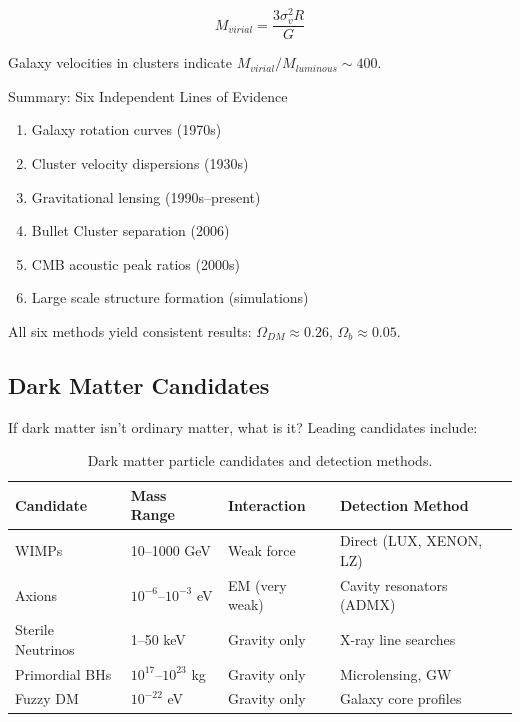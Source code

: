 \documentclass[11pt,a4paper]{article}
\begin{document}
\begin{equationbox}
\begin{equation}
M_{virial} = \frac{3\sigma_v^2 R}{G}
\label{eq:virial}
\end{equation}
\end{equationbox}

Galaxy velocities in clusters indicate $M_{virial}/M_{luminous} \sim 400$.

\begin{conceptbox}{Summary: Six Independent Lines of Evidence}
\begin{enumerate}[noitemsep]
    \item Galaxy rotation curves (1970s)
    \item Cluster velocity dispersions (1930s)
    \item Gravitational lensing (1990s--present)
    \item Bullet Cluster separation (2006)
    \item CMB acoustic peak ratios (2000s)
    \item Large scale structure formation (simulations)
\end{enumerate}
All six methods yield consistent results: $\Omega_{DM} \approx 0.26$, $\Omega_b \approx 0.05$.
\end{conceptbox}

\subsection{Dark Matter Candidates}

If dark matter isn't ordinary matter, what is it? Leading candidates include:

\begin{table}[H]
\centering
\caption{Dark matter particle candidates and detection methods.}
\label{tab:dm_candidates}
\begin{tabular}{|l|l|l|l|}
\hline
\textbf{Candidate} & \textbf{Mass Range} & \textbf{Interaction} & \textbf{Detection Method} \\
\hline
WIMPs & 10--1000 GeV & Weak force & Direct (LUX, XENON, LZ) \\
Axions & $10^{-6}$--$10^{-3}$ eV & EM (very weak) & Cavity resonators (ADMX) \\
Sterile Neutrinos & 1--50 keV & Gravity only & X-ray line searches \\
Primordial BHs & $10^{17}$--$10^{23}$ kg & Gravity only & Microlensing, GW \\
Fuzzy DM & $10^{-22}$ eV & Gravity only & Galaxy core profiles \\
\hline
\end{tabular}
\end{table}
\end{document}
